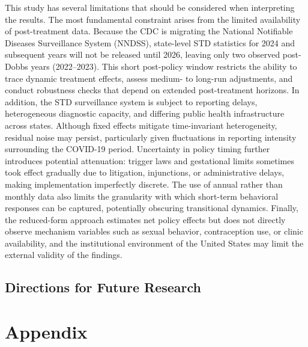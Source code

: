 \documentclass{article}
\begin{document}
This study has several limitations that should be considered when interpreting the results. The most fundamental constraint arises from the limited availability of post-treatment data. Because the CDC is migrating the National Notifiable Diseases Surveillance System (NNDSS), state-level STD statistics for 2024 and subsequent years will not be released until 2026, leaving only two observed post-Dobbs years (2022--2023). This short post-policy window restricts the ability to trace dynamic treatment effects, assess medium- to long-run adjustments, and conduct robustness checks that depend on extended post-treatment horizons. In addition, the STD surveillance system is subject to reporting delays, heterogeneous diagnostic capacity, and differing public health infrastructure across states. Although fixed effects mitigate time-invariant heterogeneity, residual noise may persist, particularly given fluctuations in reporting intensity surrounding the COVID-19 period. Uncertainty in policy timing further introduces potential attenuation: trigger laws and gestational limits sometimes took effect gradually due to litigation, injunctions, or administrative delays, making implementation imperfectly discrete. The use of annual rather than monthly data also limits the granularity with which short-term behavioral responses can be captured, potentially obscuring transitional dynamics. Finally, the reduced-form approach estimates net policy effects but does not directly observe mechanism variables such as sexual behavior, contraception use, or clinic availability, and the institutional environment of the United States may limit the external validity of the findings.

\subsection{Directions for Future Research}

\newpage


\newpage

\appendix
\renewcommand{\thetable}{\thesection.\arabic{table}}
\renewcommand{\thefigure}{\thesection.\arabic{figure}}
\setcounter{table}{0}
\setcounter{figure}{0}
\section{Appendix}




\end{document}
